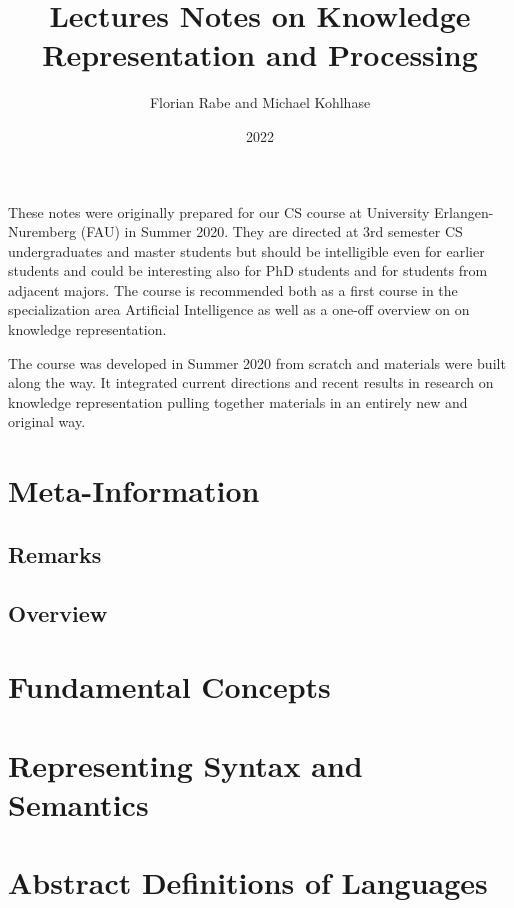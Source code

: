 \documentclass{book}
\title{Lectures Notes on Knowledge Representation and Processing}
\author{Florian Rabe and Michael Kohlhase}
\date{2022}
\begin{document}
\maketitle

\bigskip

These notes were originally prepared for our CS course at University Erlangen-Nuremberg (FAU) in Summer 2020.
They are directed at 3rd semester CS undergraduates and master students but should be intelligible even for earlier students and could be interesting also for PhD students and for students from adjacent majors.
The course is recommended both as a first course in the specialization area Artificial Intelligence as well as a one-off overview on on knowledge representation.

The course was developed in Summer 2020 from scratch and materials were built along the way.
It integrated current directions and recent results in research on knowledge representation pulling together materials in an entirely new and original way.

\tableofcontents

\newpage

\setcounter{chapter}{-1}
\chapter{Meta-Information}
 \section{Remarks}
  
\section{Overview}
  

\chapter{Fundamental Concepts}\label{sec:wuv:concepts}
  

\chapter{Representing Syntax and Semantics}\label{sec:wuv:syntax}
  
  
\chapter{Abstract Definitions of Languages}\label{sec:wuv:abstract}
  
\end{document}
